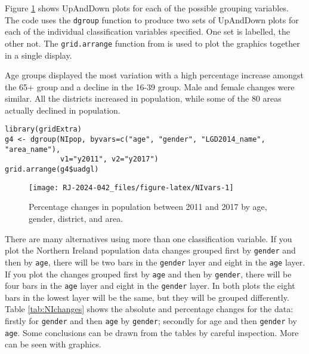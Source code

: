 Figure \ref{fig:NIvars} shows UpAndDown plots for each of the possible grouping variables. The code uses the \texttt{dgroup} function to produce two sets of UpAndDown plots for each of the individual classification variables specified. One set is labelled, the other not. The \texttt{grid.arrange} function from \citep{auguie:2017} is used to plot the graphics together in a single display.

Age groups displayed the most variation with a high percentage increase amongst the 65+ group and a decline in the 16-39 group. Male and female changes were similar. All the districts increased in population, while some of the 80 areas actually declined in population.

\begin{verbatim}
library(gridExtra)
g4 <- dgroup(NIpop, byvars=c("age", "gender", "LGD2014_name", "area_name"),
             v1="y2011", v2="y2017")
grid.arrange(g4$uadgl)
\end{verbatim}

\begin{figure}

{\centering \texttt{[image: RJ-2024-042\_files/figure-latex/NIvars-1]} 

}

\caption{Percentage changes in population between 2011 and 2017 by age, gender, district, and area.}\label{fig:NIvars}
\end{figure}

There are many alternatives using more than one classification variable. If you plot the Northern Ireland population data changes grouped first by \texttt{gender} and then by \texttt{age}, there will be two bars in the \texttt{gender} layer and eight in the \texttt{age} layer. If you plot the changes grouped first by \texttt{age} and then by \texttt{gender}, there will be four bars in the \texttt{age} layer and eight in the \texttt{gender} layer. In both plots the eight bars in the lowest layer will be the same, but they will be grouped differently. Table \ref{tab:NIchanges} shows the absolute and percentage changes for the data: firstly for \texttt{gender} and then \texttt{age} by \texttt{gender}; secondly for age and then \texttt{gender} by \texttt{age}. Some conclusions can be drawn from the tables by careful inspection. More can be seen with graphics.

